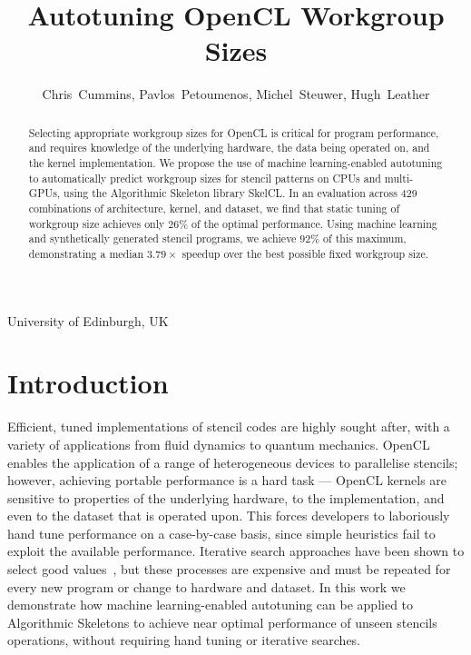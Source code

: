 \documentclass[hidelinks]{acaces}
\begin{document}
\title{Autotuning OpenCL Workgroup Sizes}

\author{
Chris~Cummins,
Pavlos~Petoumenos,
Michel~Steuwer,
Hugh~Leather
}

\address{1}{
University of Edinburgh,
UK
}

%

\pagestyle{empty}


\begin{abstract}
  Selecting appropriate workgroup sizes for OpenCL is critical for
  program performance, and requires knowledge of the underlying
  hardware, the data being operated on, and the kernel
  implementation. We propose the use of machine learning-enabled
  autotuning to automatically predict workgroup sizes for stencil
  patterns on CPUs and multi-GPUs, using the Algorithmic Skeleton
  library SkelCL. In an evaluation across 429 combinations of
  architecture, kernel, and dataset, we find that static tuning of
  workgroup size achieves only $26\%$ of the optimal
  performance. Using machine learning and synthetically generated
  stencil programs, we achieve $92\%$ of this maximum, demonstrating a
  median $3.79\times$ speedup over the best possible fixed workgroup
  size.
\end{abstract}

\vspace{-.5em}

\vspace{-2em}
\section{Introduction}

Efficient, tuned implementations of stencil codes are highly sought
after, with a variety of applications from fluid dynamics to quantum
mechanics. OpenCL enables the application of a range of heterogeneous
devices to parallelise stencils; however, achieving portable
performance is a hard task --- OpenCL kernels are sensitive to
properties of the underlying hardware, to the implementation, and even
to the dataset that is operated upon. This forces developers to
laboriously hand tune performance on a case-by-case basis, since
simple heuristics fail to exploit the available performance. Iterative
search approaches have been shown to select good
values~\cite{Nugteren2015,Ansel2013,Zhang2013a}, but these processes
are expensive and must be repeated for every new program or change to
hardware and dataset. In this work we demonstrate how machine
learning-enabled autotuning can be applied to Algorithmic Skeletons to
achieve near optimal performance of unseen stencils operations,
without requiring hand tuning or iterative searches.
\end{document}
